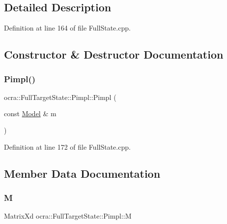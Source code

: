 \subsection{Detailed Description}


Definition at line 164 of file Full\+State.\+cpp.



\subsection{Constructor \& Destructor Documentation}
\hypertarget{structocra_1_1FullTargetState_1_1Pimpl_abf41bdded179528f89726ae9071f1377}{}\label{structocra_1_1FullTargetState_1_1Pimpl_abf41bdded179528f89726ae9071f1377} 
\subsubsection{\texorpdfstring{Pimpl()}{Pimpl()}}
{\footnotesize\ttfamily ocra\+::\+Full\+Target\+State\+::\+Pimpl\+::\+Pimpl (\begin{DoxyParamCaption}\item[{const \hyperlink{classocra_1_1Model}{Model} \&}]{m }\end{DoxyParamCaption})\hspace{0.3cm}{\ttfamily [inline]}}



Definition at line 172 of file Full\+State.\+cpp.



\subsection{Member Data Documentation}
\hypertarget{structocra_1_1FullTargetState_1_1Pimpl_aaf42a0f7ecf1e3750695edc06fb06c11}{}\label{structocra_1_1FullTargetState_1_1Pimpl_aaf42a0f7ecf1e3750695edc06fb06c11} 
\subsubsection{\texorpdfstring{M}{M}}
{\footnotesize\ttfamily Matrix\+Xd ocra\+::\+Full\+Target\+State\+::\+Pimpl\+::M}




